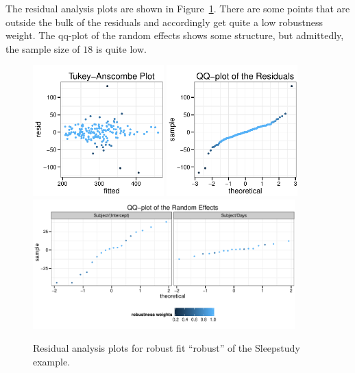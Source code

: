 \documentclass[11pt, a4paper]{article}
\theoremstyle{note}
\begin{document}
The residual analysis plots are shown in
Figure~\ref{fig:sleepstudyResidualAnalysis}. There are some points that are
outside the bulk of the residuals and accordingly get quite a low
robustness weight. The qq-plot of the random effects shows some structure,
but admittedly, the sample size of $18$ is quite low.

\begin{figure}[htbp]
  \centering
  \includegraphics[width=0.45\textwidth]{figs/fig-ex-sleepstudy-ta}
  \includegraphics[width=0.45\textwidth]{figs/fig-ex-sleepstudy-qq-resid}
  \includegraphics[width=0.9\textwidth]{figs/fig-ex-sleepstudy-qq-ranef}
  \caption{Residual analysis plots for robust fit ``robust'' of the
    Sleepstudy example.}
  \label{fig:sleepstudyResidualAnalysis}
\end{figure}
\end{document}
